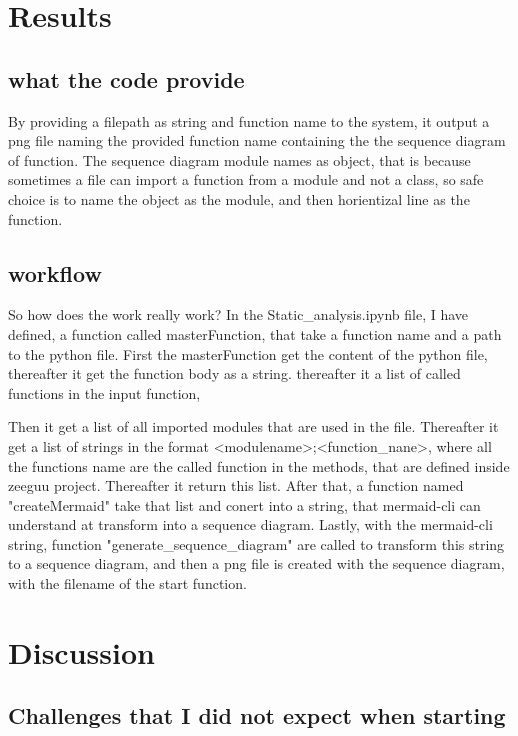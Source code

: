 \documentclass[12pt,a4paper]{report}
\begin{document}
    \chapter{Results}

    \section{what the code provide}
    By providing a filepath as string and function name to the system, it output a png file naming the provided function name containing the the sequence diagram of function. The sequence diagram module names as object, that is because sometimes a file can import a function from a module and not a class, so safe choice is to name the object as the module, and then horientizal line as the function.
   
   
    \section{workflow}
     So how does the work really work? 
    In the Static\_analysis.ipynb file, I have defined, a function called masterFunction, that take a function name and a path to the python file. First the masterFunction get the content of the python file, thereafter it get the function body as a string. thereafter it a list of called functions in the input function,
    
    Then it get a list of all imported modules that are used in the file. Thereafter it get a list of strings in the format <modulename>;<function\_nane>, where all the functions name are the called function in the methods, that are defined inside zeeguu project. Thereafter it return this list. After that, a function named "createMermaid" take that list and conert into a string, that mermaid-cli can understand at transform into a sequence diagram. Lastly, with the mermaid-cli string, function "generate\_sequence\_diagram" are called to transform this string to a sequence diagram, and then a png file is created with the sequence diagram, with the filename of the start function. 


    


    \chapter{Discussion}

    \section{Challenges that I did not expect when starting}
\end{document}
